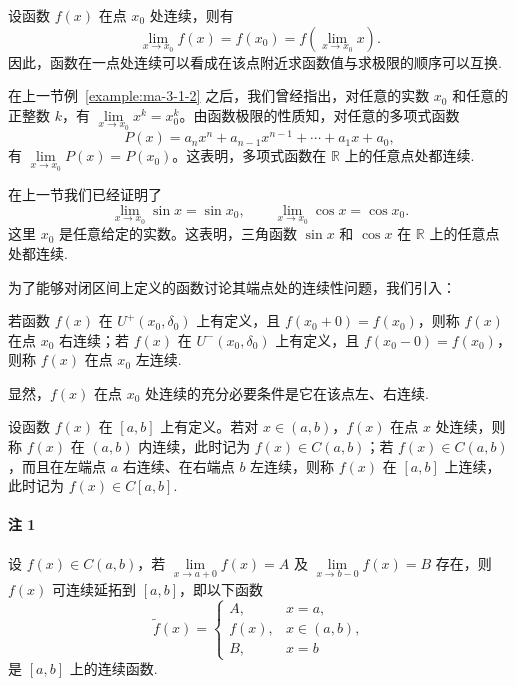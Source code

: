 设函数 $f(x)$ 在点 $x_0$ 处连续，则有
\[
  \lim_{x\to x_0}f(x)=f(x_0)=f\left(\lim_{x\to x_0}x\right).
\]
因此，函数在一点处连续可以看成在该点附近求函数值与求极限的顺序可以互换.

\begin{example}\label{example:ma-3-2-1}
在上一节例~\ref{example:ma-3-1-2} 之后，我们曾经指出，对任意的实数 $x_0$ 和任意的正整数 $k$，有 $\lim\limits_{x\to x_0}x^k=x_0^k$。由函数极限的性质知，对任意的多项式函数
\[
  P(x)=a_nx^n+a_{n-1}x^{n-1}+\cdots+a_1x+a_0,
\]
有 $\lim\limits_{x\to x_0}P(x)=P(x_0)$。这表明，多项式函数在 $\mathbb{R}$ 上的任意点处都连续.
\end{example}


\begin{example}\label{example:ma-3-2-2}
在上一节我们已经证明了
\[
  \lim_{x\to x_0}\sin x=\sin x_0,\qquad \lim_{x\to x_0}\cos x=\cos x_0.
\]
这里 $x_0$ 是任意给定的实数。这表明，三角函数 $\sin x$ 和 $\cos x$ 在 $\mathbb{R}$ 上的任意点处都连续.
\end{example}

为了能够对闭区间上定义的函数讨论其端点处的连续性问题，我们引入：

\begin{definition}\label{definition:ma-3-2-2}
若函数 $f(x)$ 在 $U^+(x_0,\delta_0)$ 上有定义，且 $f(x_0+0)=f(x_0)$，则称 $f(x)$ 在点 $x_0$ 右连续；若 $f(x)$ 在 $U^-(x_0,\delta_0)$ 上有定义，且 $f(x_0-0)=f(x_0)$，则称 $f(x)$ 在点 $x_0$ 左连续.
\end{definition}

显然，$f(x)$ 在点 $x_0$ 处连续的充分必要条件是它在该点左、右连续.

\begin{definition}\label{definition:ma-3-2-3}
设函数 $f(x)$ 在 $[a,b]$ 上有定义。若对 $x\in(a,b)$，$f(x)$ 在点 $x$ 处连续，则称 $f(x)$ 在 $(a,b)$ 内连续，此时记为 $f(x)\in C(a,b)$；若 $f(x)\in C(a,b)$，而且在左端点 $a$ 右连续、在右端点 $b$ 左连续，则称 $f(x)$ 在 $[a,b]$ 上连续，此时记为 $f(x)\in C[a,b]$.
\end{definition}


\paragraph*{注 1}
设 $f(x)\in C(a,b)$，若 $\lim\limits_{x\to a+0}f(x)=A$ 及 $\lim\limits_{x\to b-0}f(x)=B$ 存在，则 $f(x)$ 可连续延拓到 $[a,b]$，即以下函数
\[
  \tilde f(x)=
  \begin{cases}
    A, & x=a,\\
    f(x), & x\in(a,b),\\
    B, & x=b
  \end{cases}
\]
是 $[a,b]$ 上的连续函数.


